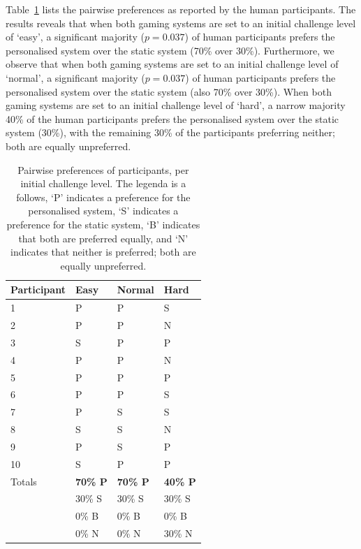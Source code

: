\documentclass[letterpaper]{article}
\begin{document}
Table~\ref{table:exp2} lists the pairwise preferences as reported by the human participants. The results reveals that when both gaming systems are set to an initial challenge level of `easy', a significant majority ($p=0.037$) of human participants prefers the personalised system over the static system (70\% over 30\%). Furthermore, we observe that when both gaming systems are set to an initial challenge level of `normal', a significant majority ($p=0.037$) of human participants prefers the personalised system over the static system (also 70\% over 30\%). When both gaming systems are set to an initial challenge level of `hard', a narrow majority 40\% of the human participants prefers the personalised system over the static system (30\%), with the remaining 30\% of the participants preferring neither; both are equally unpreferred.

\begin{table}[t]
\begin{center}
\caption{Pairwise preferences of participants, per initial challenge level. The legenda is a follows, `P' indicates a preference for the personalised system, `S' indicates a preference for the static system, `B' indicates that both are preferred equally, and `N' indicates that neither is preferred; both are equally unpreferred.}
\scriptsize
\begin{tabular}{llll}
    \toprule
    Participant & Easy & Normal & Hard \\
    \midrule
		1 & P & P & S \\
		2 & P & P & N \\
		3 & S & P & P \\
		4 & P & P & N \\
		5 & P & P & P \\
		6 & P & P & S \\
		7 & P & S & S \\
		8 & S & S & N \\
		9 & P & S & P \\
		10 & S & P & P \\
		\midrule
		Totals & \textbf{70\% P} & \textbf{70\% P} & \textbf{40\% P} \\
		       & 30\% S & 30\% S & 30\% S \\
					 & 0\% B  & 0\% B  & 0\% B  \\
					 & 0\% N  & 0\% N  & 30\% N  \\
    \bottomrule
\end{tabular}
\label{table:exp2}
\end{center}
\end{table}
\end{document}
